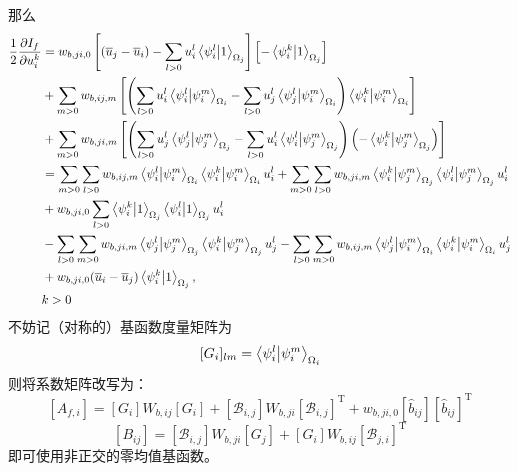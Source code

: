 \documentclass[UTF8,zihao=5]{ctexart} %
\newcommand{\trans}[0]{^\mathrm{T}}
\newcommand*{\pd}[2]{\frac{\partial #1}{\partial #2}}
\newcommand*{\mean}[1]{\overline{#1}}
\begin{document}
那么
$$
    \begin{aligned}
        \frac{1}{2}\pd{I_f}{u_i^k}
         & =
        w_{b,ji,0}\left[
            (\mean{u}_j - \mean{u}_i)
            - \sum_{l>0}u_i^l\innerproduct{\psi_i^l}{1}_{\Omega_j}
            \right]\left[
            - \innerproduct{\psi_i^k}{1}_{\Omega_j}
            \right]
        \\
         & +
        \sum_{m>0}
        {w_{b,ij,m}\left[\left(
                \sum_{l>0}u_i^l\innerproduct{\psi_i^l}{\psi_i^m}_{\Omega_i}
                - \sum_{l>0}u_j^l\innerproduct{\psi_j^l}{\psi_i^m}_{\Omega_i}
                \right)\innerproduct{\psi_i^k}{\psi_i^m}_{\Omega_i}
                \right]
        }
        \\ &+
        \sum_{m>0}
        w_{b,ji,m}\left[
            {\left(
                    \sum_{l>0}u_j^l\innerproduct{\psi_j^l}{\psi_j^m}_{\Omega_j}
                    - \sum_{l>0}u_i^l\innerproduct{\psi_i^l}{\psi_j^m}_{\Omega_j}
                    \right)\left(
                    - \innerproduct{\psi_i^k}{\psi_j^m}_{\Omega_j}
                    \right)}
        \right]                                    \\
         & =
        \sum_{m>0}\sum_{l>0}w_{b,ij,m}
        \innerproduct{\psi_i^l}{\psi_i^m}_{\Omega_i}
        \innerproduct{\psi_i^k}{\psi_i^m}_{\Omega_i}
        u_i^l +
        \sum_{m>0}\sum_{l>0}w_{b,ji,m}
        \innerproduct{\psi_i^k}{\psi_j^m}_{\Omega_j}
        \innerproduct{\psi_i^l}{\psi_j^m}_{\Omega_j}u_i^l
        \\ & +
        w_{b,ji,0}
        \sum_{l>0}
        \innerproduct{\psi_i^k}{1}_{\Omega_j}
        \innerproduct{\psi_i^l}{1}_{\Omega_j}u_i^l \\
         &
        - \sum_{l>0}\sum_{m>0}w_{b,ji,m}
        \innerproduct{\psi_j^l}{\psi_j^m}_{\Omega_j}
        \innerproduct{\psi_i^k}{\psi_j^m}_{\Omega_j}u_j^l
        - \sum_{l>0}\sum_{m>0}w_{b,ij,m}
        \innerproduct{\psi_j^l}{\psi_i^m}_{\Omega_i}
        \innerproduct{\psi_i^k}{\psi_i^m}_{\Omega_i}u_j^l
        \\ & +
        w_{b,ji,0}(\mean{u}_i - \mean{u}_j)\innerproduct{\psi_i^k}{1}_{\Omega_j}
        ,                                          \\
         & k>0
    \end{aligned}
$$
不妨记（对称的）基函数度量矩阵为
$$
    [G_i]_{lm} = \innerproduct{\psi_i^l}{\psi_i^m}_{\Omega_i}
$$
则将系数矩阵改写为：
$$
    [A_{f,i}] = [G_i]W_{b,ij}[G_i] +
    [\mathcal{B}_{i,j}] W_{b,ji} [\mathcal{B}_{i,j}]\trans
    +
    w_{b,ji,0}[\hat{b}_{ij}][\hat{b}_{ij}]\trans
$$
$$
    [B_{ij}] =
    [\mathcal{B}_{i,j}]W_{b,ji}[G_j]
    +
    [G_i]W_{b,ij}[\mathcal{B}_{j,i}]\trans
$$
即可使用非正交的零均值基函数。
\end{document}
